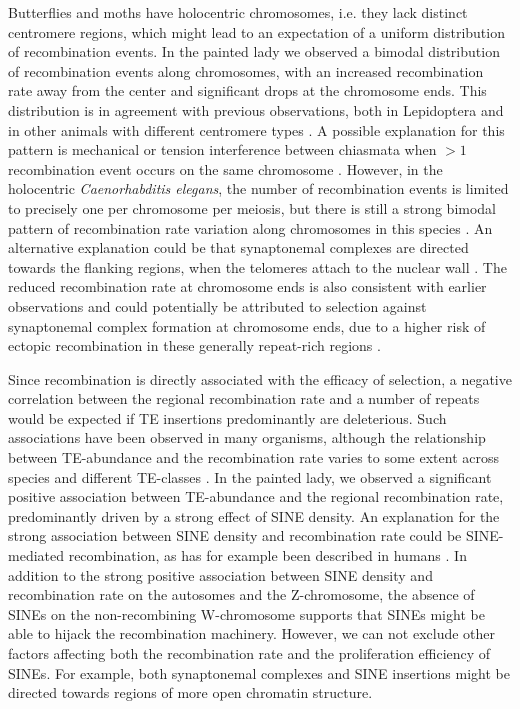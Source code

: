 \documentclass[twocolumn]{bmcart}%
\begin{document}
Butterflies and moths have holocentric chromosomes, i.e. they lack distinct centromere regions, which might lead to an expectation of a uniform distribution of recombination events. In the painted lady we observed a bimodal distribution of recombination events along chromosomes, with an increased recombination rate away from the center and significant drops at the chromosome ends. This distribution is in agreement with previous observations, both in Lepidoptera and in other animals with different centromere types \citep{haenelMetaanalysisChromosomescaleCrossover2018, martinRecombinationRateVariation2019}. A possible explanation for this pattern is mechanical or tension interference between chiasmata when $>1$ recombination event occurs on the same chromosome \citep{haenelMetaanalysisChromosomescaleCrossover2018}. However, in the holocentric \textit{Caenorhabditis elegans}, the number of recombination events is limited to precisely one per chromosome per meiosis, but there is still a strong bimodal pattern of recombination rate variation along chromosomes in this species \citep{barnesMeioticRecombinationNoncoding1995}. An alternative explanation could be that synaptonemal complexes are directed towards the flanking regions, when the telomeres attach to the nuclear wall \citep{scherthanCentromereTelomereMovements1996}. The reduced recombination rate at chromosome ends is also consistent with earlier observations and could potentially be attributed to selection against synaptonemal complex formation at chromosome ends, due to a higher risk of ectopic recombination in these generally repeat-rich regions \citep{smithNewSolutionsOld2020}.

Since recombination is directly associated with the efficacy of selection, a negative correlation between the regional recombination rate and a number of repeats would be expected if TE insertions predominantly are deleterious. Such associations have been observed in many organisms, although the relationship between TE-abundance and the recombination rate varies to some extent across species and different TE-classes \cite{kentCoevolutionTransposableElements2017, rizzonRecombinationRateDistribution2002}. In the painted lady, we observed a significant positive association between TE-abundance and the regional recombination rate, predominantly driven by a strong effect of SINE density. An explanation for the strong association between SINE density and recombination rate could be SINE-mediated  recombination, as has for example been described in humans \cite{deiningerAluRepeatsHuman1999}. In addition to the strong positive association between SINE density and recombination rate on the autosomes and the Z-chromosome, the absence of SINEs on the non-recombining W-chromosome supports that SINEs might be able to hijack the recombination machinery. However, we can not exclude other factors affecting both the recombination rate and the proliferation efficiency of SINEs. For example, both synaptonemal complexes and SINE insertions might be directed towards regions of more open chromatin structure.
\end{document}
